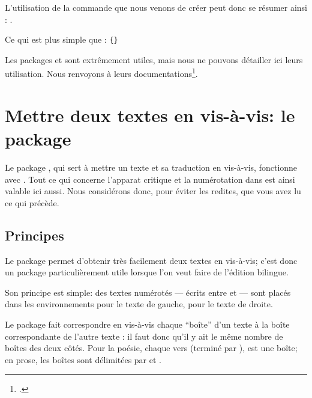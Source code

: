  L'utilisation de la commande que nous venons de créer peut donc se résumer ainsi : 
 . 

Ce qui est  plus simple que :
\verb|{|\verb|}|

\begin{plusloins}
Les packages  et  sont extrêmement utiles, mais nous ne pouvons détailler ici leurs utilisation. Nous renvoyons à leurs documentations\footcites{ifthen}{xargs}.
\end{plusloins}





 






\section{Mettre deux textes en vis-à-vis: le package }


Le package , qui sert à mettre un texte et sa traduction en vis-à-vis, fonctionne avec . Tout ce qui concerne l'apparat critique et la numérotation dans  est ainsi valable ici aussi. Nous considérons donc, pour éviter les redites, que vous avez lu ce qui précède.



\subsection{Principes}

Le package  permet d'obtenir très facilement deux textes en vis-à-vis; c'est donc un package particulièrement utile lorsque l'on veut faire de l'édition bilingue.

Son principe est simple:  des textes numérotés  --- écrits entre  et   --- sont placés dans les environnements  pour le texte de gauche,   pour le texte de droite.

Le package  fait correspondre en vis-à-vis chaque \enquote{boîte} d'un texte à la boîte correspondante de l'autre texte : il faut donc qu'il y ait le même nombre de boîtes des deux côtés. Pour la poésie,  chaque vers  (terminé par \ampersand ), est une boîte;  en prose, les boîtes sont délimitées par   et  .  

